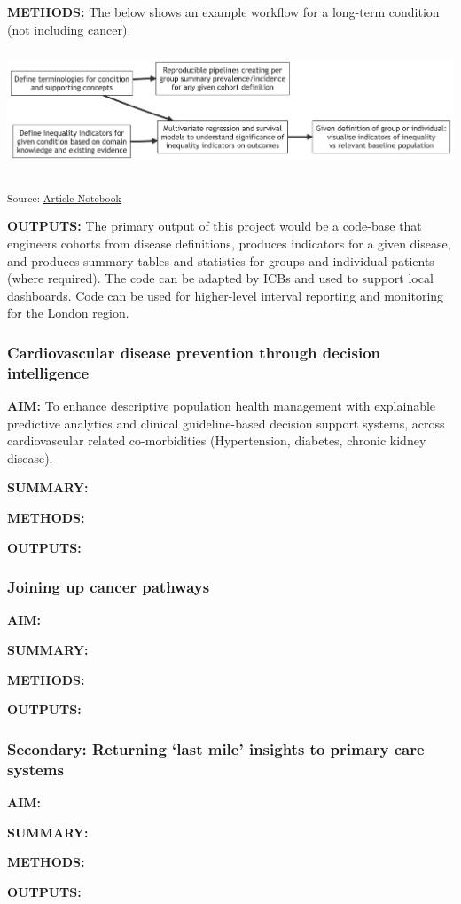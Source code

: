 \documentclass[
  letterpaper,
  DIV=11,
  numbers=noendperiod]{scrartcl}
\begin{document}
\textbf{METHODS:} The below shows an example workflow for a long-term
condition (not including cancer).

\includegraphics[width=6in,height=1.39in]{index_files/figure-latex/mermaid-figure-5.png}

\textsubscript{Source:
\href{https://d3london.github.io/sde_aic_phase0/index.qmd.html}{Article
Notebook}}

\textbf{OUTPUTS:} The primary output of this project would be a
code-base that engineers cohorts from disease definitions, produces
indicators for a given disease, and produces summary tables and
statistics for groups and individual patients (where required). The code
can be adapted by ICBs and used to support local dashboards. Code can be
used for higher-level interval reporting and monitoring for the London
region.

\subsubsection{Cardiovascular disease prevention through decision
intelligence}\label{cardiovascular-disease-prevention-through-decision-intelligence}

\textbf{AIM:} To enhance descriptive population health management with
explainable predictive analytics and clinical guideline-based decision
support systems, across cardiovascular related co-morbidities
(Hypertension, diabetes, chronic kidney disease).

\textbf{SUMMARY:}

\textbf{METHODS:}

\textbf{OUTPUTS:}

\subsubsection{Joining up cancer
pathways}\label{joining-up-cancer-pathways}

\textbf{AIM:}

\textbf{SUMMARY:}

\textbf{METHODS:}

\textbf{OUTPUTS:}

\subsubsection{Secondary: Returning `last mile' insights to primary care
systems}\label{secondary-returning-last-mile-insights-to-primary-care-systems}

\textbf{AIM:}

\textbf{SUMMARY:}

\textbf{METHODS:}

\textbf{OUTPUTS:}
\end{document}
